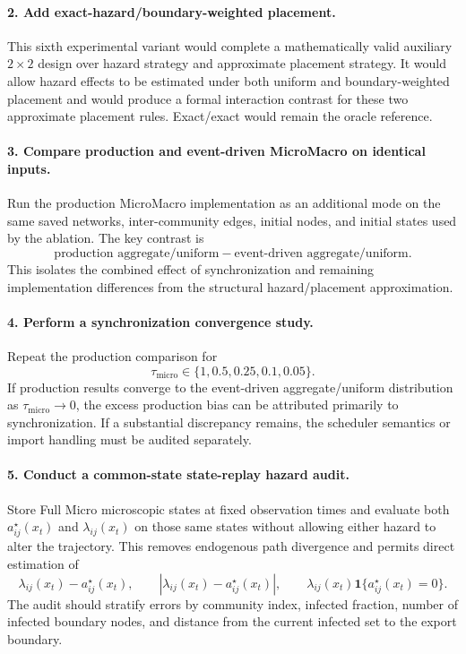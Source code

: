 \paragraph{2. Add exact-hazard/boundary-weighted placement.}
This sixth experimental variant would complete a mathematically valid auxiliary $2\times2$ design over hazard strategy and approximate placement strategy.  It would allow hazard effects to be estimated under both uniform and boundary-weighted placement and would produce a formal interaction contrast for these two approximate placement rules.  Exact/exact would remain the oracle reference.

\paragraph{3. Compare production and event-driven MicroMacro on identical inputs.}
Run the production MicroMacro implementation as an additional mode on the same saved networks, inter-community edges, initial nodes, and initial states used by the ablation.  The key contrast is
\[
\text{production aggregate/uniform}
-
\text{event-driven aggregate/uniform}.
\]
This isolates the combined effect of synchronization and remaining implementation differences from the structural hazard/placement approximation.

\paragraph{4. Perform a synchronization convergence study.}
Repeat the production comparison for
\[
\tau_{\mathrm{micro}}\in\{1,0.5,0.25,0.1,0.05\}.
\]
If production results converge to the event-driven aggregate/uniform distribution as $\tau_{\mathrm{micro}}\to0$, the excess production bias can be attributed primarily to synchronization.  If a substantial discrepancy remains, the scheduler semantics or import handling must be audited separately.

\paragraph{5. Conduct a common-state state-replay hazard audit.}
Store Full Micro microscopic states at fixed observation times and evaluate both $a^{\star}_{ij}(x_t)$ and $\lambda_{ij}(x_t)$ on those same states without allowing either hazard to alter the trajectory.  This removes endogenous path divergence and permits direct estimation of
\[
\lambda_{ij}(x_t)-a^{\star}_{ij}(x_t),
\qquad
\left|\lambda_{ij}(x_t)-a^{\star}_{ij}(x_t)\right|,
\qquad
\lambda_{ij}(x_t)\mathbf{1}\{a^{\star}_{ij}(x_t)=0\}.
\]
The audit should stratify errors by community index, infected fraction, number of infected boundary nodes, and distance from the current infected set to the export boundary.

